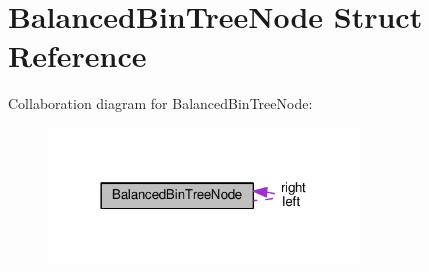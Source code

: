 \hypertarget{structBalancedBinTreeNode}{}\section{Balanced\+Bin\+Tree\+Node Struct Reference}
\label{structBalancedBinTreeNode}


Collaboration diagram for Balanced\+Bin\+Tree\+Node\+:
\nopagebreak
\begin{figure}[H]
\begin{center}
\leavevmode
\includegraphics[width=234pt]{structBalancedBinTreeNode__coll__graph}
\end{center}
\end{figure}
